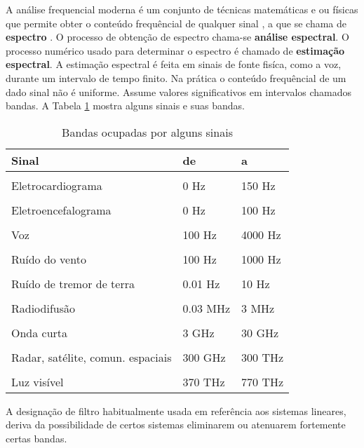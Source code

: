 A análise frequencial moderna é um conjunto de técnicas matemáticas e ou físicas que permite  obter o conteúdo frequêncial de qualquer sinal , a que se chama de \textbf {espectro} . O processo de obtenção de espectro chama-se \textbf {análise espectral}. O processo numérico usado para determinar o espectro é chamado de  \textbf {estimação espectral}. A estimação espectral é feita em sinais de fonte fisíca, como a voz, durante um intervalo de tempo finito. Na prática o conteúdo frequêncial de um dado sinal não é uniforme. Assume valores significativos em intervalos chamados bandas.  A Tabela \ref{tab:banda}
mostra alguns sinais e suas bandas.

\begin{table}[H]
\centering
\caption{Bandas ocupadas por alguns sinais}
\label{tab:banda}
\smallskip
\begin{tabular}{|l|l|l|}
\hline
Sinal  & de & a\\[0.5ex]
\hline
&&\\[-2ex]
Eletrocardiograma& 0 Hz & 150 Hz \\[0.5ex]
\hline
&&\\[-2ex]
Eletroencefalograma& 0 Hz & 100 Hz\\[0.5ex]
\hline
&&\\[-2ex]
Voz & 100 Hz & 4000 Hz\\[0.5ex]
\hline
&&\\[-2ex]
Ruído do vento& 100 Hz &1000 Hz \\[0.5ex]
\hline
&&\\[-2ex]
Ruído de tremor de terra& 0.01 Hz& 10 Hz \\[0.5ex]
\hline
&&\\[-2ex]
Radiodifusão& 0.03 MHz& 3 MHz\\[0.5ex]
\hline
&&\\[-2ex]
Onda curta& 3 GHz & 30 GHz\\[0.5ex]
\hline
&&\\[-2ex]
Radar, satélite, comun. espaciais& 300 GHz & 300 THz \\[0.5ex]
\hline
&&\\[-2ex]
Luz visível& 370 THz& 770 THz \\[0.5ex]
\hline
\end{tabular}
\end{table}


 A designação de filtro habitualmente usada em referência aos sistemas lineares, deriva da possibilidade de certos sistemas eliminarem ou atenuarem fortemente certas bandas.




























